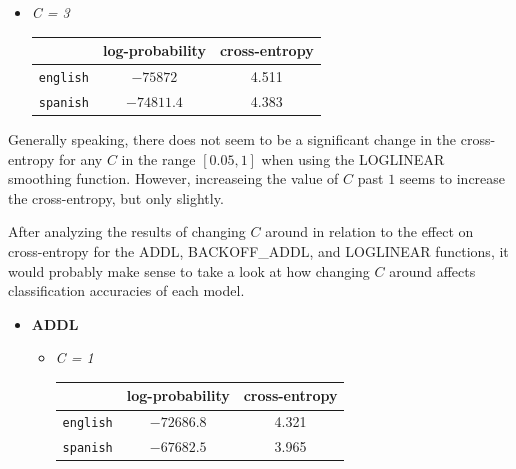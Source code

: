 \documentclass[11pt]{article}
\begin{document}
\begin{enumerate}
\begin{enumerate}[label=(\alph*)]
\begin{itemize}
\begin{itemize}
			\item[] \hspace{-24pt} \textit{C = 3} 	 \vspace{4pt} \\
				\begin{center}\begin{tabular}{| r || c | c |}
				\hline
									& log-probability	& cross-entropy \\
				\hline \hline
				\texttt{english}	& $-75872$			& 4.511			\\
				\texttt{spanish}	& $-74811.4$		& 4.383			\\
				\hline
				
				\end{tabular}\end{center}

			\end{itemize} \vspace{8pt}

			Generally speaking, there does not seem to be a significant change in the cross-entropy for any $C$ in the range $[0.05, 1]$ when using the LOGLINEAR smoothing function. However, increaseing the value of $C$ past $1$ seems to increase the cross-entropy, but only slightly.
			\vspace{8pt} \\

		\end{itemize}

		After analyzing the results of changing $C$ around in relation to the effect on cross-entropy for the ADDL, BACKOFF\_ADDL, and LOGLINEAR functions, it would probably make sense to take a look at how changing $C$ around affects classification accuracies of each model.

		\begin{itemize}
		\item[] \hspace{-24pt} \textbf{ADDL}
			\begin{itemize}
			\item[] \hspace{-24pt} \textit{C = 1} 	 \vspace{4pt}
				\begin{center}\begin{tabular}{| r || c | c |}
				\hline
									& log-probability	& cross-entropy \\
				\hline \hline
				\texttt{english}	& $-72686.8$		& 4.321			\\
				\texttt{spanish}	& $-67682.5$		& 3.965			\\
				\hline
				

\end{tabular}
\end{center}
\end{itemize}
\end{itemize}
\end{enumerate}
\end{enumerate}
\end{document}
